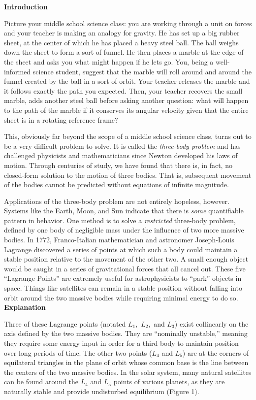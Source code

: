\noindent
\textbf{Introduction}

Picture your middle school science class: you are working through a unit on forces and your teacher is making an analogy for gravity. He has set up a big rubber sheet, at the center of which he has placed a heavy steel ball. The ball weighs down the sheet to form a sort of funnel. He then places a marble at the edge of the sheet and asks you what might happen if he lets go. You, being a well-informed science student, suggest that the marble will roll around and around the funnel created by the ball in a sort of orbit. Your teacher releases the marble and it follows exactly the path you expected. Then, your teacher recovers the small marble, adds another steel ball before asking another question: what will happen to the path of the marble if it conserves its angular velocity given that the entire sheet is in a rotating reference frame?

This, obviously far beyond the scope of a middle school science class, turns out to be a very difficult problem to solve. It is called the \textit{three-body problem} and has challenged physicists and mathematicians since Newton developed his laws of motion. Through centuries of study, we have found that there is, in fact, no closed-form solution to the motion of three bodies. That is, subsequent movement of the bodies cannot be predicted without equations of infinite magnitude.

Applications of the three-body problem are not entirely hopeless, however. Systems like the Earth, Moon, and Sun indicate that there is \emph{some} quantifiable pattern in behavior. One method is to solve a \textit{restricted} three-body problem, defined by one body of negligible mass under the influence of two more massive bodies. In 1772, Franco-Italian mathematician and astronomer Joseph-Louis Lagrange discovered a series of points at which such a body could maintain a stable position relative to the movement of the other two. A small enough object would be caught in a series of gravitational forces that all cancel out. These five “Lagrange Points” are extremely useful for astrophysicists to “park” objects in space. Things like satellites can remain in a stable position without falling into orbit around the two massive bodies while requiring minimal energy to do so.
\newline
\textbf{Explanation}

Three of these Lagrange points (notated $L_1,$ $L_2,$ and $L_3$) exist collinearly on the axis defined by the two massive bodies. They are “nominally unstable,” meaning they require some energy input in order for a third body to maintain position over long periods of time. The other two points ($L_4$ and $L_5$) are at the corners of equilateral triangles in the plane of orbit whose common base is the line between the centers of the two massive bodies. In the solar system, many natural satellites can be found around the $L_4$ and $L_5$ points of various planets, as they are naturally stable and provide undisturbed equilibrium (Figure 1). 

